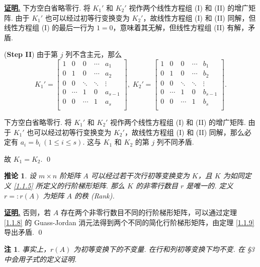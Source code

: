 \documentclass[10pt,openany]{article}
\theoremstyle{thmstyle} %
\theoremstyle{defstyle} %
\newtheorem{corollary}[theorem]{推论}
\theoremstyle{prostyle} %
\theoremstyle{exastyle}
\theoremstyle{remstyle}
\newtheorem{remark}[theorem]{注}
\renewenvironment{proof}[1][证明]{\par\underline{\textbf{#1.}} \;\fangsong}{\qed\par}
\begin{document}
\begin{proof}
	下方空白省略零行. 将 \( K_1' \) 和 \( K_2' \) 视作两个线性方程组 (I) 和 (II) 的增广矩阵. 由于 \( K_1' \) 也可以经过初等行变换变为 \( K_2' \)，故线性方程组 (I) 和 (II) 同解，但线性方程组 (I) 的最后一行为 \( 1=0 \)，意味着其无解，但线性方程组 (II) 有解，矛盾.
	
	(\textbf{Step II}) 由于第 \( j \) 列不含主元，那么
	\[ K_1'= \begin{bmatrix}
		1 & 0 & 0  & \cdots & a_1 \\
		0 & 1 & 0   & \cdots & a_2 \\
		0 & 0 & \ddots & \ddots & \vdots  \\
		0 &  \cdots & 1  & 0 & a_{s-1} \\
		0 & 0  & \cdots & 1 & a_s \\
		&  &  &  &   
	\end{bmatrix}, \; K_2'=\begin{bmatrix}
		1 & 0 & 0  & \cdots & b_1 \\
		0 & 1 & 0   & \cdots & b_2 \\
		0 & 0 & \ddots & \ddots & \vdots  \\
		0 &  \cdots & 1  & 0 & b_{s-1} \\
		0 & 0  & \cdots & 1 & b_s \\
		&  &  &  &   
	\end{bmatrix}. \]
	
	下方空白省略零行. 将 \( K_1' \) 和 \( K_2' \) 视作两个线性方程组 (I) 和 (II) 的增广矩阵. 由于 \( K_1' \) 也可以经过初等行变换变为 \( K_2' \)，故线性方程组 (I) 和 (II) 同解，那么必定有 \( a_i=b_i \ (1 \leq i \leq s) \). 这与 \( K_1 \) 和 \( K_2 \) 的第 \( j \) 列不同矛盾.
	
	故 \( K_1=K_2 \).
\end{proof}

\begin{corollary}
	设 \( m \times n \) 阶矩阵 \( A \) 可以经过若干次行初等变换变为 \( K \)，且 \( K \) 为如同定义 \ref{1.1.5} 所定义的行阶梯形矩阵. 那么 \( K \) 的非零行数目 \( r \) 是唯一的. 定义 \( r=:r(A) \) 为矩阵 \( A \) 的秩 (Rank). 
\end{corollary}

\begin{proof}
	否则，若 \( A \) 存在两个非零行数目不同的行阶梯形矩阵，可以通过定理 \ref{1.1.8} 的 Guass-Jordan 消元法得到两个不同的简化行阶梯形矩阵，由定理 \ref{1.1.9} 导出矛盾.
\end{proof}

\begin{remark}
	事实上，\( r(A) \) 为初等变换下的不变量. 在行和列初等变换下均不变. 在 \S 3 中会用子式的定义证明.
\end{remark}
\end{document}
